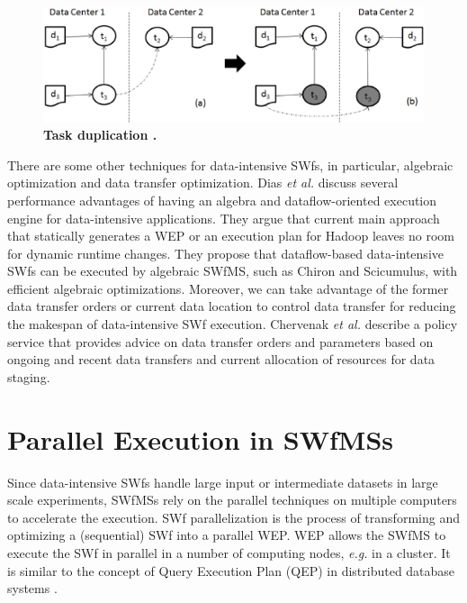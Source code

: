 \begin{figure}
\begin{centering}
\captionsetup{justification=centering}
\includegraphics[width=129mm]{figures/f5}
\par\end{centering}
\caption{\textbf{Task duplication \cite{Deng2011}. }}
\label{fig:f5} 
\end{figure}

There are some other techniques for data-intensive SWfs, in
particular, algebraic optimization and data transfer optimization. 
Dias \textit{et al.} \cite{Dias2013} discuss several performance advantages of having an 
algebra and dataflow-oriented execution engine for data-intensive
applications. They argue that current main approach that statically generates a WEP
or an execution plan for Hadoop leaves no room for dynamic runtime changes. 
They propose that dataflow-based data-intensive SWfs can be executed by 
algebraic SWfMS, such as Chiron and Scicumulus, with efficient
algebraic optimizations.  
Moreover, we can take advantage of the former data transfer orders
or current data location to control data transfer for reducing the
makespan of data-intensive SWf execution. Chervenak \textit{et
al.} \cite{Chervenak2012} describe a policy service that provides
advice on data transfer orders and parameters based on ongoing and
recent data transfers and current allocation of resources for data
staging. 


\section{Parallel Execution in SWfMSs}
\label{sec:SOAPES}

Since data-intensive SWfs handle large input or intermediate datasets in large scale experiments, SWfMSs rely on the parallel techniques on multiple computers to accelerate the execution. 
SWf parallelization is the process of transforming and optimizing
a (sequential) SWf into a parallel WEP. 
WEP allows the SWfMS to execute the SWf in parallel in a number of computing nodes, \textit{e.g.} in a cluster. 
It is similar to the concept of Query Execution Plan (QEP) in distributed database systems \cite{Ozsu2011}. 

